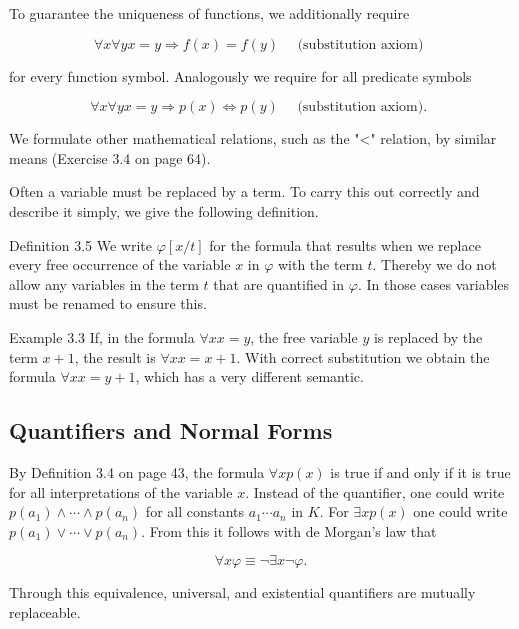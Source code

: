 \documentclass[10pt]{article}
\begin{document}
To guarantee the uniqueness of functions, we additionally require


\begin{equation*}
\forall x \forall y x=y \Rightarrow f(x)=f(y) \quad \text { (substitution axiom) } \tag{3.2}
\end{equation*}


for every function symbol. Analogously we require for all predicate symbols


\begin{equation*}
\forall x \forall y x=y \Rightarrow p(x) \Leftrightarrow p(y) \quad \text { (substitution axiom). } \tag{3.3}
\end{equation*}


We formulate other mathematical relations, such as the "<" relation, by similar means (Exercise 3.4 on page 64).

Often a variable must be replaced by a term. To carry this out correctly and describe it simply, we give the following definition.

Definition 3.5 We write $\varphi[x / t]$ for the formula that results when we replace every free occurrence of the variable $x$ in $\varphi$ with the term $t$. Thereby we do not allow any variables in the term $t$ that are quantified in $\varphi$. In those cases variables must be renamed to ensure this.

Example 3.3 If, in the formula $\forall x x=y$, the free variable $y$ is replaced by the term $x+1$, the result is $\forall x x=x+1$. With correct substitution we obtain the formula $\forall x x=y+1$, which has a very different semantic.

\subsection*{Quantifiers and Normal Forms}
By Definition 3.4 on page 43, the formula $\forall x p(x)$ is true if and only if it is true for all interpretations of the variable $x$. Instead of the quantifier, one could write $p\left(a_{1}\right) \wedge \cdots \wedge p\left(a_{n}\right)$ for all constants $a_{1} \cdots a_{n}$ in $K$. For $\exists x p(x)$ one could write $p\left(a_{1}\right) \vee \cdots \vee p\left(a_{n}\right)$. From this it follows with de Morgan's law that

$$
\forall x \varphi \equiv \neg \exists x \neg \varphi .
$$

Through this equivalence, universal, and existential quantifiers are mutually replaceable.
\end{document}

